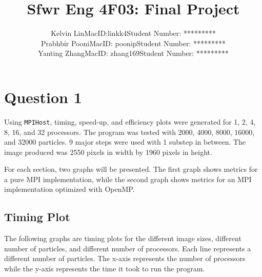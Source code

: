\documentclass{article}
\begin{document}
\title{Sfwr Eng 4F03: Final Project}

\author{Kelvin Lin\hspace{10mm}MacID:linkk4\hspace{10mm}Student Number: *********\\Prabhbir Pooni\hspace{10mm}MacID: poonip\hspace{10mm}Student Number: *********\\Yanting Zhang\hspace{10mm}MacID: zhang169\hspace{10mm}Student Number: *********}

\maketitle

\section{Question 1}
Using \texttt{MPIHost}, timing, speed-up, and efficiency plots were generated for 1, 2, 4, 8, 16, and 32 processors. The program was tested with 2000, 4000, 8000, 16000, and 32000 particles. 9 major steps were used with 1 substep in between. The image produced was 2550 pixels in width by 1960 pixels in height.

For each section, two graphs will be presented. The first graph shows metrics for a pure MPI implementation, while the second graph shows metrics for an MPI implementation optimized with OpenMP.

\subsection{Timing Plot}
The following graphs are timing plots for the different image sizes, different number of particles, and different number of processors. Each line represents a different number of particles. The x-axis represents the number of processors while the y-axis represents the time it took to run the program.
\end{document}
